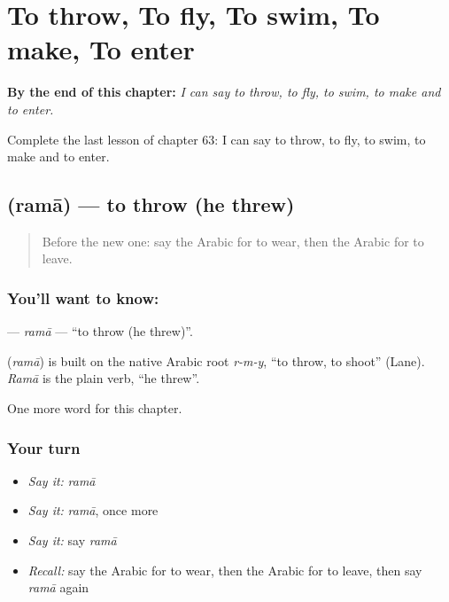 
\chapter{To throw, To fly, To swim, To make, To enter}
\label{ch:ar-to-throw-to-fly-to-swim-to-make-to-enter}

\begin{chapteropening}
\textbf{By the end of this chapter:} \emph{I can say to throw, to fly, to swim, to make and to enter.}

Complete the last lesson of chapter 63: I can say to throw, to fly, to swim, to make and to enter.
\end{chapteropening}

\section[\texorpdfstring{\ar{رمى} (ramā)}{رمى (ramā)}]{ (ramā) — to throw (he threw)}

\label{lesson:AR-C63-rama}



\begin{quote}
Before the new one: say the Arabic for to wear, then the Arabic for to leave.
\end{quote}

\subsection*{You'll want to know: }
\textbf{} — \emph{ramā} — \textquotedblleft{}to throw (he threw)\textquotedblright{}.

\begin{cousinweb}
\textbf{} (\emph{ramā}) is built on the native Arabic root \emph{r-m-y}, \textquotedblleft{}to throw, to shoot\textquotedblright{} (Lane). \emph{Ramā} is the plain verb, \textquotedblleft{}he threw\textquotedblright{}.
\end{cousinweb}

\begin{grammarlens}[title={What you've built}]
One more word for this chapter.
\end{grammarlens}

\subsection*{Your turn}
\begin{itemize}
\raggedright
  \item \emph{Say it:} \emph{ramā}
  \item \emph{Say it:} \emph{ramā}, once more
  \item \emph{Say it:} say \emph{ramā}
  \item \emph{Recall:} say the Arabic for to wear, then the Arabic for to leave, then say \emph{ramā} again
\end{itemize}

